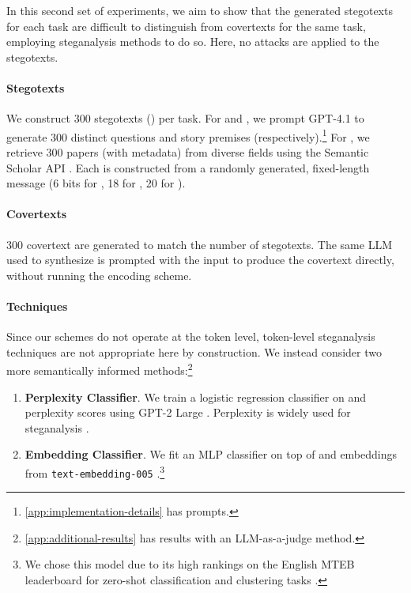 In this second set of experiments, we aim to show that the generated stegotexts for each task are difficult to distinguish from covertexts for the same task, employing steganalysis methods to do so. Here, no attacks are applied to the stegotexts.

\paragraph{Stegotexts} We construct 300 stegotexts (\stegotext) per task. For \qa and \sg, we prompt GPT-4.1 to generate 300 distinct questions and story premises (respectively).\footnote{\autoref{app:implementation-details} has prompts.} For \lr, we retrieve 300 papers (with metadata) from diverse fields using the Semantic Scholar API \citep{kinney2023semantic}. Each \stegotext is constructed from a randomly generated, fixed-length message \msg (6 bits for \qa, 18 for \sg, 20 for \lr).

\paragraph{Covertexts} 300 covertext are generated to match the number of stegotexts. The same LLM used to synthesize \stegotext is prompted with the input \inp to produce the covertext \covertext directly, without running the encoding scheme.

\paragraph{Techniques}
Since our schemes do not operate at the token level, token-level steganalysis techniques are not appropriate here by construction. We instead consider two more semantically informed methods:\footnote{\autoref{app:additional-results} has results with an LLM-as-a-judge method.}
\begin{enumerate}[itemsep=0pt,parsep=1pt]
    \item \textbf{Perplexity Classifier}. We train a logistic regression classifier on \covertext and \stegotext perplexity scores using GPT-2 Large \citep{radford2019language}. Perplexity is widely used for steganalysis \citep[][\emph{i.a.}]{meng2008linguistic,kaptchuk2021meteor}.
    \item \textbf{Embedding Classifier}. We fit an MLP classifier on top of \covertext and \stegotext embeddings from \texttt{text-embedding-005} \citep{lee2024gecko}.\footnote{We chose this model due to its high rankings on the English MTEB leaderboard for zero-shot classification and clustering tasks \citep{muennighoff2023mteb}.}
\end{enumerate}

